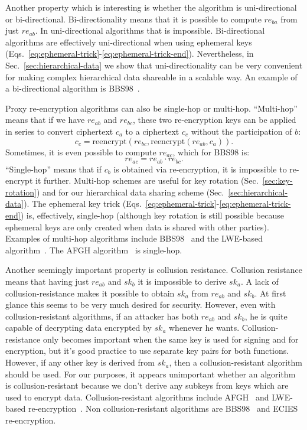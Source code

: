 \documentclass[longbibliography,nofootinbib]{revtex4-1}
\begin{document}
Another property which is interesting is whether the algorithm is uni-directional or bi-directional.
Bi-directionality means that it is possible to compute $re_{ba}$ from just $re_{ab}$.
In uni-directional algorithms that is impossible.
Bi-directional algorithms are effectively uni-directional when using ephemeral keys
(Eqs.~\ref{eq:ephemeral-trick}-\ref{eq:ephemeral-trick-end}).
Nevertheless, in Sec.~\ref{sec:hierarchical-data} we show that uni-directionality can be very convenient for making complex hierarchical data shareable in a
scalable way.
An example of a bi-directional algorithm is BBS98~\cite{BBS98}.

Proxy re-encryption algorithms can also be single-hop or multi-hop.
``Multi-hop'' means that if we have $re_{ab}$ and $re_{bc}$, these two re-encryption keys can be applied in series to convert ciphertext $c_a$ to a ciphertext
$c_c$ without the participation of $b$:
$$c_c = \text{reencrypt}(re_{bc}, \text{reencrypt}(re_{ab}, c_a)).$$
Sometimes, it is even possible to compute $re_{ac}$, which for BBS98 is:
$$re_{ac} = re_{ab} \cdot re_{bc}.$$
``Single-hop'' means that if $c_b$ is obtained via re-encryption, it is impossible to re-encrypt it further.
Multi-hop schemes are useful for key rotation (Sec.~\ref{sec:key-rotation}) and for our hierarchical data sharing scheme (Sec.~\ref{sec:hierarchical-data}).
The ephemeral key trick (Eqs.~\ref{eq:ephemeral-trick}-\ref{eq:ephemeral-trick-end}) is, effectively, single-hop
(although key rotation is still possible because ephemeral keys are only created when data is shared with other parties).
Examples of multi-hop algorithms include BBS98~\cite{BBS98} and the LWE-based algorithm~\cite{lwe-reencryption}.
The AFGH algorithm~\cite{AFGH} is single-hop.

Another seemingly important property is collusion resistance.
Collusion resistance means that having just $re_{ab}$ and $sk_b$ it is impossible to derive $sk_a$.
A lack of collusion-resistance makes it possible to obtain $sk_a$ from $re_{ab}$ and $sk_b$.
At first glance this seems to be very much desired for security.
However, even with collusion-resistant algorithms, if an attacker has both $re_{ab}$ and $sk_b$, he is quite capable of decrypting data encrypted by
$sk_a$ whenever he wants.
Collusion-resistance only becomes important when the same key is used for signing and for encryption, but it's good practice to use separate key pairs
for both functions.
However, if any other key is derived from $sk_a$, then a collusion-resistant algorithm should be used.
For our purposes, it appears unimportant whether an algorithm is collusion-resistant because we don't derive any subkeys from keys which are used to
encrypt data.
Collusion-resistant algorithms include AFGH~\cite{AFGH} and LWE-based re-encryption~\cite{lwe-reencryption}.
Non collusion-resistant algorithms are BBS98~\cite{BBS98} and ECIES re-encryption.
\end{document}
